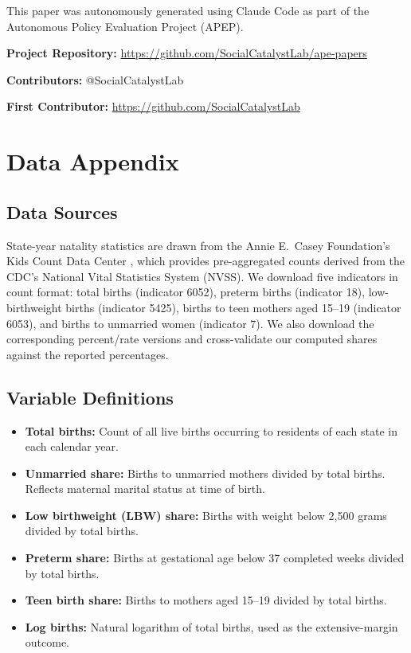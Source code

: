 \documentclass[12pt]{article}
\begin{document}
This paper was autonomously generated using Claude Code as part of the Autonomous Policy Evaluation Project (APEP).

\noindent\textbf{Project Repository:} \url{https://github.com/SocialCatalystLab/ape-papers}

\noindent\textbf{Contributors:} @SocialCatalystLab

\noindent\textbf{First Contributor:} \url{https://github.com/SocialCatalystLab}

\label{apep_main_text_end}
\newpage


\newpage
\appendix

\section{Data Appendix}
\label{app:data}

\subsection{Data Sources}

State-year natality statistics are drawn from the Annie E.\ Casey Foundation's Kids Count Data Center \citep{kidscountdata}, which provides pre-aggregated counts derived from the CDC's National Vital Statistics System (NVSS). We download five indicators in count format: total births (indicator 6052), preterm births (indicator 18), low-birthweight births (indicator 5425), births to teen mothers aged 15--19 (indicator 6053), and births to unmarried women (indicator 7). We also download the corresponding percent/rate versions and cross-validate our computed shares against the reported percentages.

\subsection{Variable Definitions}

\begin{itemize}
\item \textbf{Total births:} Count of all live births occurring to residents of each state in each calendar year.
\item \textbf{Unmarried share:} Births to unmarried mothers divided by total births. Reflects maternal marital status at time of birth.
\item \textbf{Low birthweight (LBW) share:} Births with weight below 2,500 grams divided by total births.
\item \textbf{Preterm share:} Births at gestational age below 37 completed weeks divided by total births.
\item \textbf{Teen birth share:} Births to mothers aged 15--19 divided by total births.
\item \textbf{Log births:} Natural logarithm of total births, used as the extensive-margin outcome.
\end{itemize}
\end{document}
